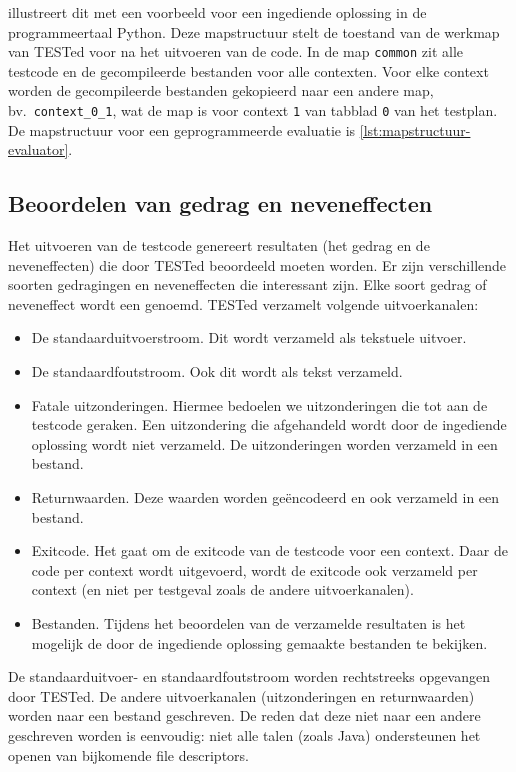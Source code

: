  illustreert dit met een voorbeeld voor een ingediende oplossing in de programmeertaal Python.
Deze mapstructuur stelt de toestand van de werkmap van TESTed voor na het uitvoeren van de code.
In de map \texttt{common} zit alle testcode en de gecompileerde bestanden voor alle contexten.
Voor elke context worden de gecompileerde bestanden gekopieerd naar een andere map, bv.\ \texttt{context\_0\_1}, wat de map is voor context \texttt{1} van tabblad \texttt{0} van het testplan.
De mapstructuur voor een geprogrammeerde evaluatie is \cref{lst:mapstructuur-evaluator}.

\subsection{Beoordelen van gedrag en neveneffecten}\label{subsec:beoordelen-van-gedrag}

Het uitvoeren van de testcode genereert resultaten (het gedrag en de neveneffecten) die door TESTed beoordeeld moeten worden.
Er zijn verschillende soorten gedragingen en neveneffecten die interessant zijn.
Elke soort gedrag of neveneffect wordt een  genoemd.
TESTed verzamelt volgende uitvoerkanalen:
\begin{itemize}
    \item De standaarduitvoerstroom.
    Dit wordt verzameld als tekstuele uitvoer.
    \item De standaardfoutstroom.
    Ook dit wordt als tekst verzameld.
    \item Fatale uitzonderingen.
    Hiermee bedoelen we uitzonderingen die tot aan de testcode geraken.
    Een uitzondering die afgehandeld wordt door de ingediende oplossing wordt niet verzameld.
    De uitzonderingen worden verzameld in een bestand.
    \item Returnwaarden.
    Deze waarden worden geëncodeerd en ook verzameld in een bestand.
    \item Exitcode.
    Het gaat om de exitcode van de testcode voor een context.
    Daar de code per context wordt uitgevoerd, wordt de exitcode ook verzameld per context (en niet per testgeval zoals de andere uitvoerkanalen).
    \item Bestanden.
    Tijdens het beoordelen van de verzamelde resultaten is het mogelijk de door de ingediende oplossing gemaakte bestanden te bekijken.
\end{itemize}

De standaarduitvoer- en standaardfoutstroom worden rechtstreeks opgevangen door TESTed.
De andere uitvoerkanalen (uitzonderingen en returnwaarden) worden naar een bestand geschreven.
De reden dat deze niet naar een andere  geschreven worden is eenvoudig: niet alle talen (zoals Java) ondersteunen het openen van bijkomende file descriptors.

